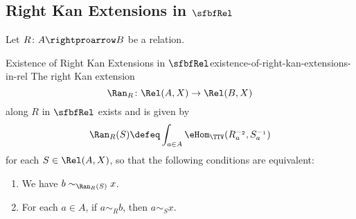 \subsection{Right Kan Extensions in $\sfbfRel$}\label{subsection-right-kan-extensions-in-rel}
Let $R\colon A\rightproarrow B$ be a relation.
\begin{proposition}{Existence of Right Kan Extensions in $\sfbfRel$}{existence-of-right-kan-extensions-in-rel}%
    The right Kan extension
    \[
        \Ran_{R}%
        \colon%
        \Rel(A,X)%
        \to%
        \Rel(B,X)%
    \]%
    along $R$ in $\sfbfRel$ exists and is given by
    \[
        \Ran_{R}(S)%
        \defeq%
        \int_{a\in A}\eHom_{\TTV}(R^{-_{2}}_{a},S^{-_{1}}_{a})
    \]%
    for each $S\in\Rel(A,X)$, so that the following conditions are equivalent:
    \begin{enumerate}
        \item\label{existence-of-right-kan-extensions-in-rel-1}We have $b\sim_{\Ran_{R}(S)}x$.
        \item\label{existence-of-right-kan-extensions-in-rel-2}For each $a\in A$, if $a\sim_{R}b$, then $a\sim_{S}x$.
    \end{enumerate}
\end{proposition}
